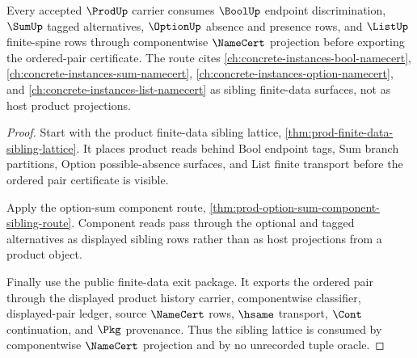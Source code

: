 \begin{theorem}
\label{thm:prod-finite-data-sibling-lattice-route}
Every accepted $\ProdUp$ carrier consumes $\BoolUp$ endpoint discrimination, $\SumUp$ tagged alternatives, $\OptionUp$ absence and presence rows, and $\ListUp$ finite-spine rows through componentwise $\NameCert$ projection before exporting the ordered-pair certificate. The route cites \autoref{ch:concrete-instances-bool-namecert}, \autoref{ch:concrete-instances-sum-namecert}, \autoref{ch:concrete-instances-option-namecert}, and \autoref{ch:concrete-instances-list-namecert} as sibling finite-data surfaces, not as host product projections.
\end{theorem}
\begin{proof}
Start with the product finite-data sibling lattice, \autoref{thm:prod-finite-data-sibling-lattice}. It places product reads behind Bool endpoint tags, Sum branch partitions, Option possible-absence surfaces, and List finite transport before the ordered pair certificate is visible.

Apply the option-sum component route, \autoref{thm:prod-option-sum-component-sibling-route}. Component reads pass through the optional and tagged alternatives as displayed sibling rows rather than as host projections from a product object.

Finally use the public finite-data exit package. It exports the ordered pair through the displayed product history carrier, componentwise classifier, displayed-pair ledger, source $\NameCert$ rows, $\hsame$ transport, $\Cont$ continuation, and $\Pkg$ provenance. Thus the sibling lattice is consumed by componentwise $\NameCert$ projection and by no unrecorded tuple oracle.
\end{proof}
